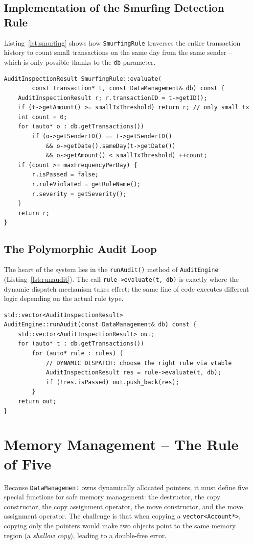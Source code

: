     \subsection{Implementation of the Smurfing Detection Rule}
    Listing~\ref{lst:smurfing} shows how \texttt{SmurfingRule} traverses the entire transaction history to count small transactions on the same day from the same sender -- which is only possible thanks to the \texttt{db} parameter.

\begin{lstlisting}[caption={Smurfing detection logic}, label={lst:smurfing}]
AuditInspectionResult SmurfingRule::evaluate(
        const Transaction* t, const DataManagement& db) const {
    AuditInspectionResult r; r.transactionID = t->getID();
    if (t->getAmount() >= smallTxThreshold) return r; // only small tx
    int count = 0;
    for (auto* o : db.getTransactions())
        if (o->getSenderID() == t->getSenderID()
            && o->getDate().sameDay(t->getDate())
            && o->getAmount() < smallTxThreshold) ++count;
    if (count >= maxFrequencyPerDay) {
        r.isPassed = false;
        r.ruleViolated = getRuleName();
        r.severity = getSeverity();
    }
    return r;
}
\end{lstlisting}

    \subsection{The Polymorphic Audit Loop}
    The heart of the system lies in the \texttt{runAudit()} method of \texttt{AuditEngine} (Listing~\ref{lst:runaudit}). The call \texttt{rule->evaluate(t, db)} is exactly where the dynamic dispatch mechanism takes effect: the same line of code executes different logic depending on the actual rule type.

\begin{lstlisting}[caption={The audit loop with dynamic dispatch}, label={lst:runaudit}]
std::vector<AuditInspectionResult>
AuditEngine::runAudit(const DataManagement& db) const {
    std::vector<AuditInspectionResult> out;
    for (auto* t : db.getTransactions())
        for (auto* rule : rules) {
            // DYNAMIC DISPATCH: choose the right rule via vtable
            AuditInspectionResult res = rule->evaluate(t, db);
            if (!res.isPassed) out.push_back(res);
        }
    return out;
}
\end{lstlisting}

\section{Memory Management -- The Rule of Five}
    Because \texttt{DataManagement} owns dynamically allocated pointers, it must define five special functions for safe memory management: the destructor, the copy constructor, the copy assignment operator, the move constructor, and the move assignment operator. The challenge is that when copying a \texttt{vector<Account*>}, copying only the pointers would make two objects point to the same memory region (a \textit{shallow copy}), leading to a double-free error.

